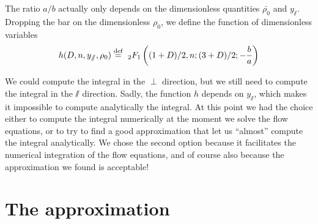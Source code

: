 The ratio $a/b$ actually only depends on the dimensionless quantities $\bar{\rho_0}$ and $y_\sslash$. Dropping the bar on the dimensionless $\rho_0$, we define the function of dimensionless variables
\begin{equation}
h(D, n, y_\sslash, \rho_0) \define \ _2F_1\left((1+D)/2,n;(3+D)/2;-\frac{b}{a}\right)
\end{equation}

We could compute the integral in the $\perp$ direction, but we still need to compute the integral in the $\sslash$ direction. Sadly, the function $h$ depends on $y_\sslash$, which makes it impossible to compute analytically the integral. At this point we had the choice either to compute the integral numerically at the moment we solve the flow equations, or to try to find a good approximation that let us ``almost'' compute the integral analytically. We chose the second option because it facilitates the numerical integration of the flow equations, and of course also because the approximation we found is acceptable!

\section{The approximation}

